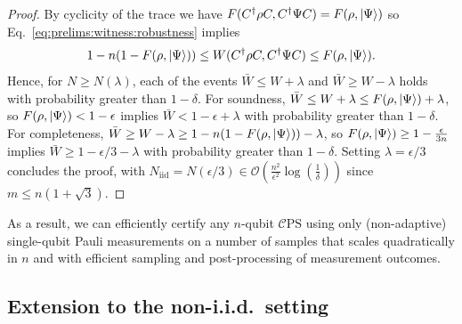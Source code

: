 \documentclass[a4paper,twocolumn,11pt,unpublished]{quantumarticle}
\newcommand{\Niid}{N_{\mathrm{iid}}}
\newcommand{\mCEPS}{\mathcal{C}\text{PS}}
\begin{document}
\begin{proof}
        By cyclicity of the trace we have $F(C^\dagger\rho C,C^\dagger\Psi C)=F(\rho,\ket\Psi)$ so Eq.~\eqref{eq:prelims:witness:robustness} implies
        \begin{equation}
            1-n(1-F(\rho,\ket\Psi)) \leq W(C^\dagger\rho C,C^\dagger\Psi C) \leq F(\rho,\ket\Psi).
        \end{equation}
        Hence, for $N\ge N(\lambda)$, each of the events $\bar W \leq W + \lambda$ and $\bar W \geq W - \lambda$ holds with probability greater than $1-\delta$. For soundness, $\bar W \leq W+\lambda \leq F(\rho,\ket\Psi)+\lambda$, so $F(\rho,\ket\Psi)<1-\epsilon$ implies $\bar W<1-\epsilon+\lambda$ with probability greater than $1-\delta$. For completeness, $\bar W \geq W-\lambda \geq 1-n(1-F(\rho,\ket\Psi))-\lambda$, so $F(\rho,\ket\Psi)\ge1-\frac\epsilon{3n}$ implies $\bar W\ge1-\epsilon/3-\lambda$ with probability greater than $1-\delta$. Setting $\lambda=\epsilon/3$ concludes the proof, with $\Niid=N(\epsilon/3)\in\mathcal O(\frac{n^2}{\epsilon^2}\log(\frac{1}{\delta}))$ since $m\le n(1+\sqrt3)$.
        \end{proof}
        As a result, we can efficiently certify any $n$-qubit $\mCEPS$ using only (non-adaptive) single-qubit Pauli measurements on a number of samples that scales quadratically in $n$ and with efficient sampling and post-processing of measurement outcomes.


\subsection{Extension to the non-i.i.d.\ setting}
\end{document}

